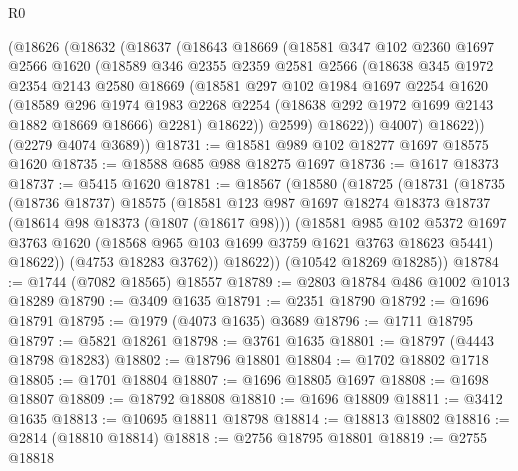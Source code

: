 \begin{lexlean}{R0}
\begin{coremodule}
      (@18626
        (@18632
          (@18637
            (@18643
              @18669
              (@18581
                @347
                @102
                @2360
                @1697
                @2566
                @1620
                (@18589
                  @346
                  @2355
                  @2359
                  @2581
                  @2566
                  (@18638
                    @345
                    @1972
                    @2354
                    @2143
                    @2580
                    @18669
                    (@18581
                      @297
                      @102
                      @1984
                      @1697
                      @2254
                      @1620
                      (@18589
                        @296
                        @1974
                        @1983
                        @2268
                        @2254
                        (@18638 @292 @1972 @1699 @2143 @1882 @18669 @18666)
                        @2281)
                      @18622))
                  @2599)
                @18622))
            @4007)
          @18622))
      (@2279 @4074 @3689))
@18731 := @18581 @989 @102 @18277 @1697 @18575 @1620
@18735 := @18588 @685 @988 @18275 @1697
@18736 := @1617 @18373
@18737 := @5415 @1620
@18781 := @18567
    (@18580
      (@18725
        (@18731
          (@18735
            (@18736 @18737)
            @18575
            (@18581
              @123
              @987
              @1697
              @18274
              @18373
              @18737
              (@18614 @98 @18373 (@1807 (@18617 @98)))
              (@18581
                @985
                @102
                @5372
                @1697
                @3763
                @1620
                (@18568 @965 @103 @1699 @3759 @1621 @3763 @18623 @5441)
                @18622))
            (@4753 @18283 @3762))
          @18622))
      (@10542 @18269 @18285))
@18784 := @1744 (@7082 @18565) @18557
@18789 := @2803 @18784 @486 @1002 @1013 @18289
@18790 := @3409 @1635
@18791 := @2351 @18790
@18792 := @1696 @18791
@18795 := @1979 (@4073 @1635) @3689
@18796 := @1711 @18795
@18797 := @5821 @18261
@18798 := @3761 @1635
@18801 := @18797 (@4443 @18798 @18283)
@18802 := @18796 @18801
@18804 := @1702 @18802 @1718
@18805 := @1701 @18804
@18807 := @1696 @18805 @1697
@18808 := @1698 @18807
@18809 := @18792 @18808
@18810 := @1696 @18809
@18811 := @3412 @1635
@18813 := @10695 @18811 @18798
@18814 := @18813 @18802
@18816 := @2814 (@18810 @18814)
@18818 := @2756 @18795 @18801
@18819 := @2755 @18818

\end{coremodule}
\end{lexlean}
